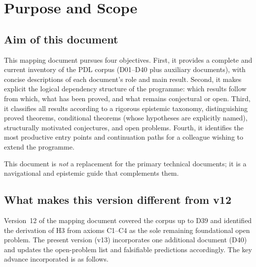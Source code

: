 \documentclass[11pt,a4paper]{article}
\theoremstyle{plain}
\theoremstyle{definition}
\theoremstyle{remark}
\begin{document}
\section{Purpose and Scope}
\label{sec:purpose}

\subsection{Aim of this document}
\label{subsec:aim}

This mapping document pursues four objectives.
First, it provides a complete and current inventory of the PDL corpus (D01--D40 plus auxiliary documents), with concise descriptions of each document's role and main result.
Second, it makes explicit the logical dependency structure of the programme: which results follow from which, what has been proved, and what remains conjectural or open.
Third, it classifies all results according to a rigorous epistemic taxonomy, distinguishing proved theorems, conditional theorems (whose hypotheses are explicitly named), structurally motivated conjectures, and open problems.
Fourth, it identifies the most productive entry points and continuation paths for a colleague wishing to extend the programme.

This document is \emph{not} a replacement for the primary technical documents; it is a navigational and epistemic guide that complements them.

\subsection{What makes this version different from v12}
\label{subsec:diff_v12}

Version~12 of the mapping document covered the corpus up to D39 and identified the derivation of H3 from axioms C1--C4 as the sole remaining foundational open problem.
The present version (v13) incorporates one additional document (D40) and updates the open-problem list and falsifiable predictions accordingly.
The key advance incorporated is as follows.
\end{document}
